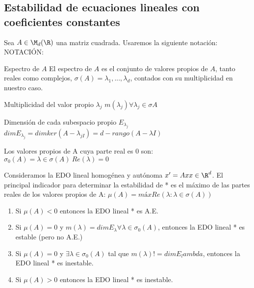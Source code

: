 \subsection{Estabilidad de ecuaciones lineales con coeficientes constantes}
Sea $A \in \M_d(\R)$ una matriz cuadrada.  Usaremos la siguiente notación:
NOTACIÓN:
\begin{ndef}{Espectro de $A$}
El espectro de $A$ es el conjunto de valores propios de $A$, tanto reales como complejos, $\sigma(A)={\lambda_1,...,\lambda_d}$, contados con su multiplicidad en nuestro caso.
\end{ndef}
\begin{ndef}{Multiplicidad del valor propio $\lambda_j$}
$m(\lambda_j) \forall \lambda_j \in \sigma{A}$
\end{ndef}
\begin{ndef}{Dimensión de cada subespacio propio $E_{\lambda_j}$}
$dim E_{\lambda_j} = dim ker(A-\lambda_{jI})= d-rango(A-\lambda I)$
\end{ndef}
\begin{ndef}
Los valores propios de A cuya parte real es 0 son:
$\sigma_0(A)={\lambda \in \sigma(A) \ Re(\lambda)=0}$
\end{ndef}

Consideramos la EDO lineal homogénea y autónoma $x'=Ax x\in\R^d$. El principal indicador para determinar la estabilidad de * es el máximo de las partes reales de los valores propios de A:
$\mu(A)=máx{Re(\lambda : \lambda\in\sigma(A))}$

\begin{nth}
\begin{enumerate}
\item Si $\mu(A)<0$ entonces la EDO lineal * es A.E.
\item Si $\mu(A)=0$ y $m(\lambda)=dimE_\lambda \forall \lambda \in \sigma_0(A)$, entonces la EDO lineal * es estable (pero no A.E.)
\item Si $\mu(A)=0$ y $\exists \lambda \in \sigma_0(A)$ tal que $m(\lambda) != dim E_lambda$, entonces la EDO lineal * es inestable.
\item Si $\mu(A)>0$ entonces la EDO lineal * es inestable.
\end{enumerate}
\end{nth}


